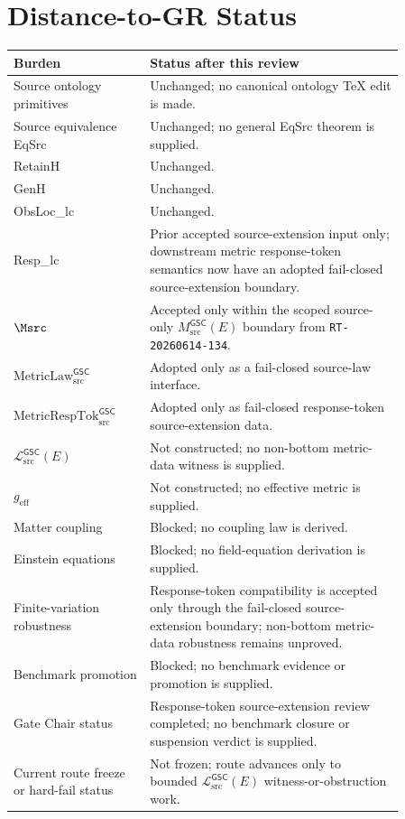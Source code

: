 \documentclass[11pt]{article}
\newcommand{\MsrcGSC}{M_{\mathrm{src}}^{\mathsf{GSC}}}
\newcommand{\MetricLaw}{\mathrm{MetricLaw}_{\mathrm{src}}^{\mathsf{GSC}}}
\newcommand{\MetricRespTok}{\mathrm{MetricRespTok}_{\mathrm{src}}^{\mathsf{GSC}}}
\newcommand{\MetricData}{\mathcal{L}_{\mathrm{src}}^{\mathsf{GSC}}}
\newcommand{\geff}{g_{\mathrm{eff}}}
\begin{document}
\section{Distance-to-GR Status}

\begin{longtable}{p{0.30\linewidth}p{0.56\linewidth}}
\toprule
Burden & Status after this review \\
\midrule
Source ontology primitives & Unchanged; no canonical ontology TeX edit is made. \\
Source equivalence EqSrc & Unchanged; no general EqSrc theorem is supplied. \\
RetainH & Unchanged. \\
GenH & Unchanged. \\
ObsLoc\_lc & Unchanged. \\
Resp\_lc & Prior accepted source-extension input only; downstream metric response-token semantics now have an adopted fail-closed source-extension boundary. \\
\(\Msrc\) & Accepted only within the scoped source-only \(\MsrcGSC(E)\) boundary from \texttt{RT-20260614-134}. \\
\(\MetricLaw\) & Adopted only as a fail-closed source-law interface. \\
\(\MetricRespTok\) & Adopted only as fail-closed response-token source-extension data. \\
\(\MetricData(E)\) & Not constructed; no non-bottom metric-data witness is supplied. \\
\(\geff\) & Not constructed; no effective metric is supplied. \\
Matter coupling & Blocked; no coupling law is derived. \\
Einstein equations & Blocked; no field-equation derivation is supplied. \\
Finite-variation robustness & Response-token compatibility is accepted only through the fail-closed source-extension boundary; non-bottom metric-data robustness remains unproved. \\
Benchmark promotion & Blocked; no benchmark evidence or promotion is supplied. \\
Gate Chair status & Response-token source-extension review completed; no benchmark closure or suspension verdict is supplied. \\
Current route freeze or hard-fail status & Not frozen; route advances only to bounded \(\MetricData(E)\) witness-or-obstruction work. \\
\bottomrule
\end{longtable}
\end{document}
